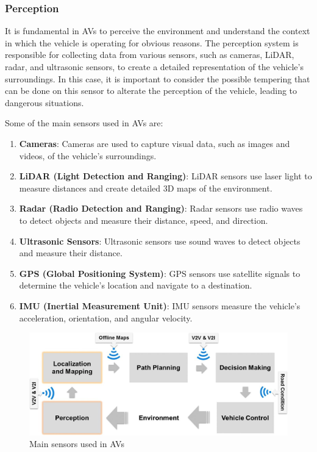 \subsubsection{Perception}\label{subsubsec:perception}
It is fundamental in AVs to perceive the environment and understand the context in which the vehicle is operating for obvious reasons.
The perception system is responsible for collecting data from various sensors, such as cameras, LiDAR, radar, and ultrasonic sensors, to create a detailed representation of the vehicle's surroundings.
In this case, it is important to consider the possible tempering that can be done on this sensor to alterate the perception of the vehicle, leading to dangerous situations\cite{kim2020cybersecurity, sec-sensors-2023, metro2020analysis, attacks-2020}.

Some of the main sensors used in AVs are:
\begin{enumerate}
    \item \textbf{Cameras}: Cameras are used to capture visual data, such as images and videos, of the vehicle's surroundings.
    \item \textbf{LiDAR (Light Detection and Ranging)}: LiDAR sensors use laser light to measure distances and create detailed 3D maps of the environment.
    \item \textbf{Radar (Radio Detection and Ranging)}: Radar sensors use radio waves to detect objects and measure their distance, speed, and direction.
    \item \textbf{Ultrasonic Sensors}: Ultrasonic sensors use sound waves to detect objects and measure their distance.
    \item \textbf{GPS (Global Positioning System)}: GPS sensors use satellite signals to determine the vehicle's location and navigate to a destination.
    \item \textbf{IMU (Inertial Measurement Unit)}: IMU sensors measure the vehicle's acceleration, orientation, and angular velocity.
\end{enumerate}

\begin{figure}[!htb]
    \centering
    \includegraphics[width=0.7\linewidth]{figures/perception}
    \caption{Main sensors used in AVs}
    \label{fig:sensors}
\end{figure}

